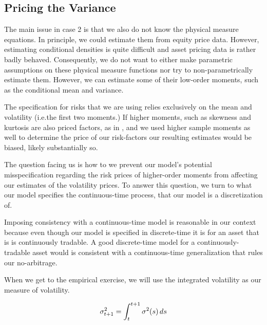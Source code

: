 \documentclass[11pt, letterpaper, twoside, final]{article}
\begin{document}



\subsection{Pricing the Variance}\label{sec:pricing_the_variance}


The main issue in case 2 is that we also do not know the physical measure equations.
In principle, we could estimate them from equity price data.
However, estimating conditional densities is quite difficult and asset pricing data is rather badly behaved.
Consequently, we do not want to either make parametric assumptions on these physical measure functions nor try to
non-parametrically estimate them.
However, we can estimate some of their low-order moments, such as the conditional mean and variance.


The specification for risks that we are using relies exclusively on the mean and volatility (i.e.\@ the first two
moments.)
If higher moments, such as skewness and kurtosis are also priced factors, as in \textcites{harvey2000conditional,
conrad2012exante, chang2013market},  and we used higher sample moments as well to determine the price of our
risk-factors our resulting estimates would be biased, likely substantially so. 

The question facing us is how to we prevent our model's potential misspecification regarding the risk prices of
higher-order moments from affecting our estimates of the volatility prices.
To answer this question, we turn to what our model specifies the continuous-time process, that our model is a
discretization of.

Imposing consistency with a continuous-time model is reasonable in our context because even though our model is
specified in discrete-time it is for an asset that is is continuously tradable.
A good discrete-time model for a continuously-tradable asset would is consistent with a continuous-time
generalization that rules our no-arbitrage.

When we get to the empirical exercise, we will use the integrated volatility as our measure of volatility.
 
\begin{defn}
    \begin{equation}
        \sigma^2_{t+1} = \int_{t}^{t+1} \sigma^2(s) \mathop{}\!d s
    \end{equation}
\end{defn}
\end{document}
